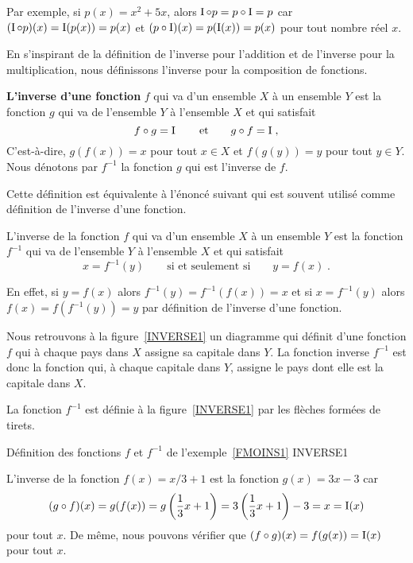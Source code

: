 {\begin{egg}
Par exemple, si $p(x) = x^2 + 5x$, alors $\operatorname{I} \circ p = p \circ \operatorname{I} = p$
car $(\operatorname{I} \circ p)(x) = \operatorname{I}(p(x)) = p(x)$ et
$(p \circ \operatorname{I})(x) = p(\operatorname{I}(x)) = p(x)$ pour tout nombre réel $x$.
\end{egg}

En s'inspirant de la définition de l'inverse pour l'addition et de
l'inverse pour la multiplication, nous définissons l'inverse pour la
composition de fonctions.

\begin{focus}{\dfn} 
{\bfseries L'inverse d'une fonction} $f$ qui
va d'un ensemble $X$ à un ensemble $Y$ est la fonction $g$ qui va de
l'ensemble $Y$ à l'ensemble $X$ et qui satisfait
\[
f\circ g = \operatorname{I} \qquad \text{et}  \qquad  g \circ f = \operatorname{I} \; ,
\]
C'est-à-dire, $g(f(x)) = x$ pour tout $x \in X$ et $f(g(y)) = y$
pour tout $y\in Y$.  Nous dénotons par $f^{-1}$ la fonction $g$ qui est
l'inverse de $f$.
\end{focus}

Cette définition est équivalente à l'énoncé suivant qui est
souvent utilisé comme défini\-tion de l'inverse d'une fonction.

\begin{focus}{\dfn}
L'inverse de la fonction $f$ qui va d'un ensemble $X$ à un ensemble
$Y$ est la fonction $f^{-1}$ qui va de l'ensemble $Y$ à l'ensemble $X$
et qui satisfait
\[
x = f^{-1}(y) \qquad \text{si et seulement si} \qquad y = f(x) \; .
\]
\end{focus}

En effet, si $y=f(x)$ alors $f^{-1}(y) = f^{-1}(f(x)) = x$ et si
$x = f^{-1}(y)$ alors $f(x) = f(f^{-1}(y)) = y$ par définition de l'inverse
d'une fonction.

\begin{egg}
Nous retrouvons à la figure~\ref{INVERSE1} un diagramme qui définit
d'une fonction $f$ qui à chaque pays dans $X$ assigne sa capitale dans
$Y$.  La fonction inverse $f^{-1}$ est donc la fonction qui, à chaque
capitale dans $Y$, assigne le pays dont elle est la capitale dans $X$.

La fonction $f^{-1}$ est définie à la figure~\ref{INVERSE1} par les
flèches formées de tirets.
\label{FMOINS1}
\end{egg}

{Définition des fonctions $f$ et $f^{-1}$ de l'exemple~\ref{FMOINS1}}
{INVERSE1}

\begin{egg}
L'inverse de la fonction $f(x) = x/3 + 1$ est la fonction $g(x) = 3x - 3$ car
\[
(g \circ f)(x) = g(f(x)) = g\left( \frac{1}{3}x + 1 \right)
= 3\left(\frac{1}{3}x+1\right) - 3 = x = \operatorname{I}(x)
\]
pour tout $x$.  De même, nous pouvons vérifier que
$(f \circ g)(x) = f(g(x)) = \operatorname{I}(x)$ pour tout $x$.


\end{egg}}
